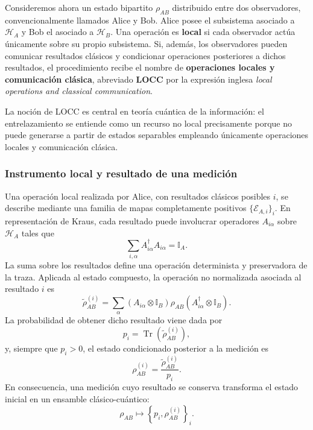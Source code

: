 \documentclass[12pt,a4paper]{article}
\theoremstyle{definition}
\theoremstyle{plain}
\theoremstyle{remark}
\newcommand{\Hil}{\mathcal{H}}
\newcommand{\I}{\mathbb{I}}
\newcommand{\TrA}{\operatorname{Tr}}
\begin{document}
Consideremos ahora un estado bipartito $\rho_{AB}$ distribuido entre dos observadores, convencionalmente llamados Alice y Bob. Alice posee el subsistema asociado a $\Hil_A$ y Bob el asociado a $\Hil_B$. Una operación es \textbf{local} si cada observador actúa únicamente sobre su propio subsistema. Si, además, los observadores pueden comunicar resultados clásicos y condicionar operaciones posteriores a dichos resultados, el procedimiento recibe el nombre de \textbf{operaciones locales y comunicación clásica}, abreviado \textbf{LOCC} por la expresión inglesa \emph{local operations and classical communication}.

La noción de LOCC es central en teoría cuántica de la información: el entrelazamiento se entiende como un recurso no local precisamente porque no puede generarse a partir de estados separables empleando únicamente operaciones locales y comunicación clásica.

\subsubsection*{Instrumento local y resultado de una medición}

Una operación local realizada por Alice, con resultados clásicos posibles $i$, se describe mediante una familia de mapas completamente positivos $\{\mathcal{E}_{A,i}\}_i$. En representación de Kraus, cada resultado puede involucrar operadores $A_{i\alpha}$ sobre $\Hil_A$ tales que
\begin{equation*}
    \sum_{i,\alpha} A_{i\alpha}^{\dagger}A_{i\alpha}=\I_A.
\end{equation*}
La suma sobre los resultados define una operación determinista y preservadora de la traza. Aplicada al estado compuesto, la operación no normalizada asociada al resultado $i$ es
\begin{equation*}
    \widetilde{\rho}_{AB}^{(i)}
    =\sum_\alpha
    \left(A_{i\alpha}\otimes\I_B\right)
    \rho_{AB}
    \left(A_{i\alpha}^{\dagger}\otimes\I_B\right).
\end{equation*}
La probabilidad de obtener dicho resultado viene dada por
\begin{equation*}
    p_i=\TrA\!\left(\widetilde{\rho}_{AB}^{(i)}\right),
\end{equation*}
y, siempre que $p_i>0$, el estado condicionado posterior a la medición es
\begin{equation*}
    \rho_{AB}^{(i)}
    =\frac{\widetilde{\rho}_{AB}^{(i)}}{p_i}.
\end{equation*}
En consecuencia, una medición cuyo resultado se conserva transforma el estado inicial en un ensamble clásico-cuántico:
\begin{equation*}
    \rho_{AB}
    \longmapsto
    \left\{p_i,\rho_{AB}^{(i)}\right\}_i.
\end{equation*}
\end{document}
